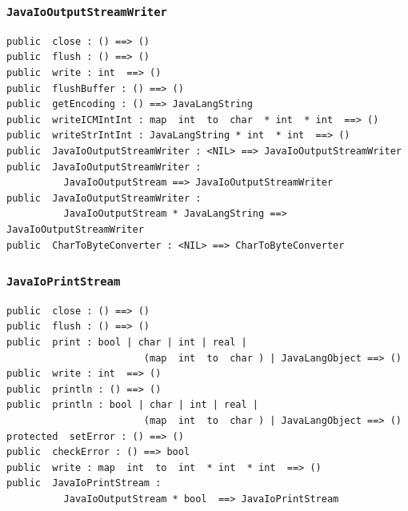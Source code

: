 \documentclass[\pformat,12pt]{article}
\begin{document}
\subsubsection{\texttt{JavaIoOutputStreamWriter}}
\begin{small}
\begin{verbatim}
public  close : () ==> ()
public  flush : () ==> ()
public  write : int  ==> ()
public  flushBuffer : () ==> ()
public  getEncoding : () ==> JavaLangString
public  writeICMIntInt : map  int  to  char  * int  * int  ==> ()
public  writeStrIntInt : JavaLangString * int  * int  ==> ()
public  JavaIoOutputStreamWriter : <NIL> ==> JavaIoOutputStreamWriter
public  JavaIoOutputStreamWriter : 
          JavaIoOutputStream ==> JavaIoOutputStreamWriter
public  JavaIoOutputStreamWriter : 
          JavaIoOutputStream * JavaLangString ==> JavaIoOutputStreamWriter
public  CharToByteConverter : <NIL> ==> CharToByteConverter
\end{verbatim}
\end{small}

\subsubsection{\texttt{JavaIoPrintStream}}
\begin{small}
\begin{verbatim}
public  close : () ==> ()
public  flush : () ==> ()
public  print : bool | char | int | real | 
                        (map  int  to  char ) | JavaLangObject ==> ()
public  write : int  ==> ()
public  println : () ==> ()
public  println : bool | char | int | real | 
                        (map  int  to  char ) | JavaLangObject ==> ()
protected  setError : () ==> ()
public  checkError : () ==> bool
public  write : map  int  to  int  * int  * int  ==> ()
public  JavaIoPrintStream : 
          JavaIoOutputStream * bool  ==> JavaIoPrintStream
\end{verbatim}
\end{small}
\end{document}
